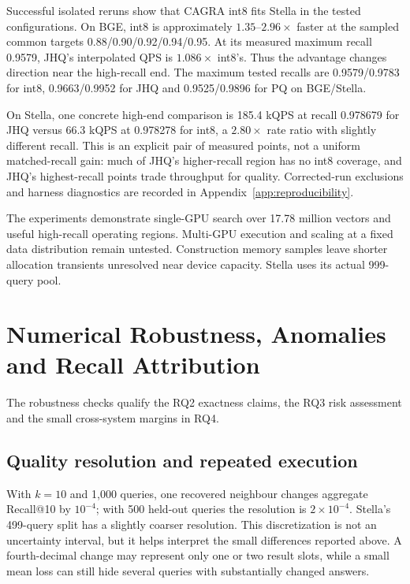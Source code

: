 Successful isolated reruns show that CAGRA int8 fits Stella in the
tested configurations. On BGE, int8 is approximately $1.35$--$2.96\times$
faster at the sampled common targets 0.88/0.90/0.92/0.94/0.95. At its
measured maximum recall 0.9579, JHQ's interpolated QPS is $1.086\times$
int8's. Thus the advantage changes direction near the high-recall end.
The maximum tested recalls are 0.9579/0.9783 for int8, 0.9663/0.9952
for JHQ and 0.9525/0.9896 for PQ on BGE/Stella.

On Stella, one concrete high-end comparison is 185.4 kQPS at recall
0.978679 for JHQ versus 66.3 kQPS at 0.978278 for int8, a $2.80\times$
rate ratio with slightly different recall. This is an explicit pair of
measured points, not a uniform matched-recall gain: much of JHQ's
higher-recall region has no int8 coverage, and JHQ's highest-recall
points trade throughput for quality. Corrected-run exclusions and
harness diagnostics are recorded in Appendix~\ref{app:reproducibility}.

The experiments demonstrate single-GPU search over 17.78 million vectors
and useful high-recall operating regions. Multi-GPU execution and
scaling at a fixed data distribution remain untested. Construction
memory samples leave shorter allocation transients unresolved near
device capacity. Stella uses its actual 999-query pool.

\section{Numerical Robustness, Anomalies and Recall Attribution}
\label{sec:7-8}

The robustness checks qualify the RQ2 exactness claims, the RQ3 risk
assessment and the small cross-system margins in RQ4.

\subsection{Quality resolution and repeated execution}

With $k=10$ and 1,000 queries, one recovered neighbour changes aggregate
Recall@10 by $10^{-4}$; with 500 held-out queries the resolution is
$2\times10^{-4}$. Stella's 499-query split has a slightly coarser
resolution. This discretization is not an uncertainty interval, but it
helps interpret the small differences reported above. A fourth-decimal
change may represent only one or two result slots, while a small mean
loss can still hide several queries with substantially changed answers.

